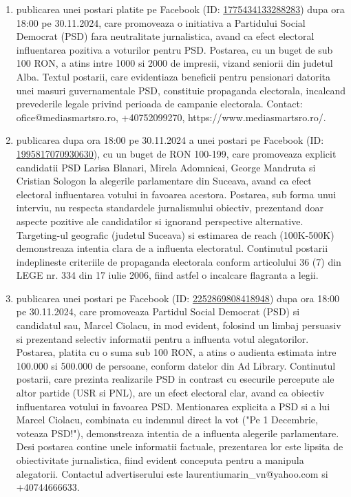 \documentclass[a4paper,12pt]{article}
\begin{document}
\begin{enumerate}[leftmargin=*, label=\arabic*.)]
    \item publicarea unei postari platite pe Facebook (ID: \href{https://www.facebook.com/ads/library/?id=1775434133288283}{1775434133288283}) dupa ora 18:00 pe 30.11.2024, care promoveaza o initiativa a Partidului Social Democrat (PSD) fara neutralitate jurnalistica, avand ca efect electoral influentarea pozitiva a voturilor pentru PSD. Postarea, cu un buget de sub 100 RON, a atins intre 1000 si 2000 de impresii, vizand seniorii din judetul Alba.  Textul postarii, care evidentiaza beneficii pentru pensionari datorita unei masuri guvernamentale PSD, constituie propaganda electorala, incalcand prevederile legale privind perioada de campanie electorala.  Contact: ofice@mediasmartsro.ro, +40752099270, https://www.mediasmartsro.ro/.
    \item publicarea dupa ora 18:00 pe 30.11.2024 a unei postari pe Facebook (ID: \href{https://www.facebook.com/ads/library/?id=1995817070930630}{1995817070930630}), cu un buget de RON 100-199, care promoveaza explicit candidatii PSD Larisa Blanari, Mirela Adomnicai, George Mandruta si Cristian Sologon la alegerile parlamentare din Suceava, avand ca efect electoral influentarea votului in favoarea acestora. Postarea, sub forma unui interviu, nu respecta standardele jurnalismului obiectiv, prezentand doar aspecte pozitive ale candidatilor si ignorand perspective alternative.  Targeting-ul geografic (judetul Suceava) si estimarea de reach (100K-500K) demonstreaza intentia clara de a influenta electoratul.  Continutul postarii indeplineste criteriile de propaganda electorala conform articolului 36 (7) din LEGE nr. 334 din 17 iulie 2006, fiind astfel o incalcare flagranta a legii.
    \item publicarea unei postari pe Facebook (ID: \href{https://www.facebook.com/ads/library/?id=2252869808418948}{2252869808418948}) dupa ora 18:00 pe 30.11.2024, care promoveaza Partidul Social Democrat (PSD) si candidatul sau, Marcel Ciolacu, in mod evident, folosind un limbaj persuasiv si prezentand selectiv informatii pentru a influenta votul alegatorilor. Postarea, platita cu o suma sub 100 RON, a atins o audienta estimata intre 100.000 si 500.000 de persoane, conform datelor din Ad Library.  Continutul postarii, care prezinta realizarile PSD in contrast cu esecurile percepute ale altor partide (USR si PNL), are un efect electoral clar, avand ca obiectiv influentarea votului in favoarea PSD.  Mentionarea explicita a PSD si a lui Marcel Ciolacu, combinata cu indemnul direct la vot ("Pe 1 Decembrie, voteaza PSD!"), demonstreaza intentia de a influenta alegerile parlamentare.  Desi postarea contine unele informatii factuale, prezentarea lor este lipsita de obiectivitate jurnalistica, fiind evident conceputa pentru a manipula alegatorii.  Contactul advertiserului este laurentiumarin\_vn@yahoo.com si +40744666633.

\end{enumerate}
\end{document}
